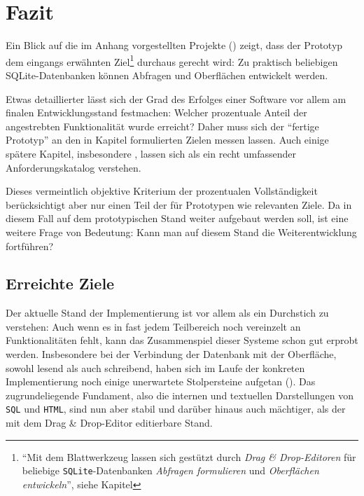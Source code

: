 \section{Fazit}
\label{sec:conclusion}

Ein Blick auf die im Anhang vorgestellten Projekte () zeigt, dass der Prototyp dem eingangs erwähnten Ziel\footnote{"`Mit dem Blattwerkzeug lassen sich gestützt durch \textit{Drag \& Drop-Editoren} für beliebige \texttt{SQLite}-Datenbanken \textit{Abfragen formulieren} und \textit{Oberflächen entwickeln}"', siehe Kapitel } durchaus gerecht wird: Zu praktisch beliebigen SQLite-Datenbanken können Abfragen und Oberflächen entwickelt werden.

Etwas detaillierter lässt sich der Grad des Erfolges einer Software vor allem am finalen Entwicklungsstand festmachen: Welcher prozentuale Anteil der angestrebten Funktionalität wurde erreicht? Daher muss sich der "`fertige Prototyp"' an den in Kapitel  formulierten Zielen messen lassen. Auch einige spätere Kapitel, insbesondere , lassen sich als ein recht umfassender Anforderungskatalog verstehen.

Dieses vermeintlich objektive Kriterium der prozentualen Vollständigkeit berücksichtigt aber nur einen Teil der für Prototypen wie  \idename{} relevanten Ziele. Da in diesem Fall auf dem prototypischen Stand weiter aufgebaut werden soll, ist eine weitere Frage von Bedeutung: Kann man auf diesem Stand die Weiterentwicklung fortführen?

\subsection{Erreichte Ziele}

Der aktuelle Stand der Implementierung ist vor allem als ein Durchstich zu verstehen: Auch wenn es in fast jedem Teilbereich noch vereinzelt an Funktionalitäten fehlt, kann das Zusammenspiel dieser Systeme schon gut erprobt werden. Insbesondere bei der Verbindung der Datenbank mit der Oberfläche, sowohl lesend als auch schreibend, haben sich im Laufe der konkreten Implementierung noch einige unerwartete Stolpersteine aufgetan (). Das zugrundeliegende Fundament, also die internen und textuellen Darstellungen von \texttt{SQL} und \texttt{HTML}, sind nun aber stabil und darüber hinaus auch mächtiger, als der mit dem Drag \& Drop-Editor editierbare Stand.

